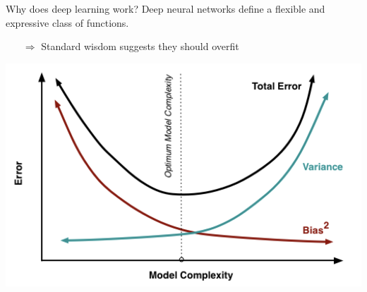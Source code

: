 \documentclass[10pt, aspectratio=169]{beamer}
\begin{document}
\begin{frame}[t]{Why does deep learning work?}
Deep neural networks define a flexible and expressive class of functions.
\begin{itemize}
    \item[$\Rightarrow$] Standard wisdom suggests they should overfit 
\end{itemize}
\begin{center}
    \includegraphics[width=0.6\linewidth]{part-4-images/U-curve.png} 
\end{center}
\end{frame}
%
\end{document}
